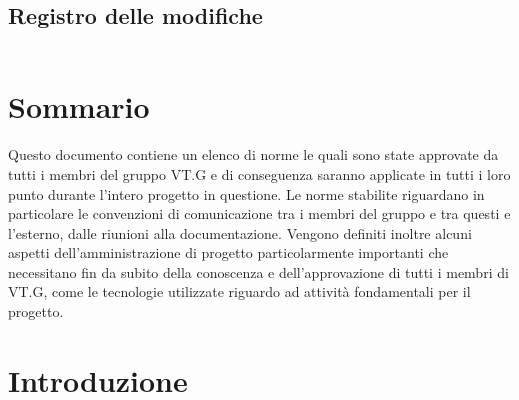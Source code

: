 \newcommand{\nomedoc}{Norme di progetto}
\newcommand{\versione}{0.1}
\newcommand{\nomefile}{NormeDiProgetto\versione.pdf}
\newcommand{\datacreazione}{7 Dicembre 2010}
\newcommand{\datamodifica}{8 Dicembre 2010}
\newcommand{\stato}{formale}
\newcommand{\uso}{interno}
\newcommand{\redazione}{Baron Federico}
\newcommand{\verifica}{Caputo Cosimo}
\newcommand{\approvazione}{}
\newcommand{\distribuzione}{
VT.G \\
& Prof. Vardanega Tullio }







\section*{Registro delle modifiche}
\begin{tabular}{lll}


\end{tabular}

\tableofcontents
\thispagestyle{fancy} %


\chapter*{Sommario}
Questo documento contiene un elenco di norme le quali sono state approvate da
tutti i membri del gruppo VT.G e di conseguenza saranno applicate in tutti i
loro punto durante l'intero progetto in questione.
Le norme stabilite riguardano in particolare le convenzioni di comunicazione tra
i membri del gruppo e tra questi e l'esterno, dalle riunioni alla
documentazione.
Vengono definiti inoltre alcuni aspetti dell'amministrazione di progetto
particolarmente importanti che necessitano fin da subito della conoscenza e
dell'approvazione di tutti i membri di VT.G, come le tecnologie utilizzate
riguardo ad attività fondamentali per il progetto.

\thispagestyle{fancy} %


\chapter{Introduzione}
\thispagestyle{fancy} %

